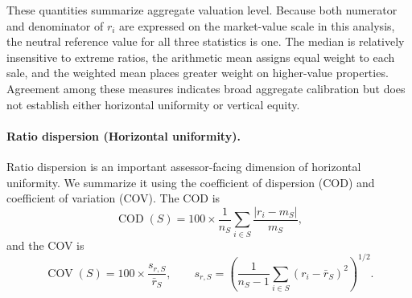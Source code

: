 \documentclass[10pt]{article}
\theoremstyle{definition}
\newcommand{\1}{\mathbf{1}}
\begin{document}

{These quantities summarize aggregate valuation level. Because both numerator and denominator of $r_i$ are expressed on the market-value scale in this analysis, the neutral reference value for all three statistics is one. The median is relatively insensitive to extreme ratios, the arithmetic mean assigns equal weight to each sale, and the weighted mean places greater weight on higher-value properties. Agreement among these measures indicates broad aggregate calibration but does not establish either horizontal uniformity or vertical equity.}


\paragraph{Ratio dispersion (Horizontal uniformity).}
Ratio dispersion is an important assessor-facing dimension of horizontal uniformity. We summarize it using the coefficient of dispersion (COD) and coefficient of variation (COV). The COD is
\begin{equation}
\label{eq:cod}
\operatorname{COD}(S)
=
100\times
\frac{1}{n_S}
\sum_{i\in S}
\frac{|r_i-m_S|}{m_S},
\end{equation}
and the COV is
\begin{equation}
\label{eq:cov}
\operatorname{COV}(S)
=
100\times
\frac{s_{r,S}}{\bar r_S},
\qquad
s_{r,S}
=
\left(
\frac{1}{n_S-1}
\sum_{i\in S}(r_i-\bar r_S)^2
\right)^{1/2}.
\end{equation}

\end{document}
